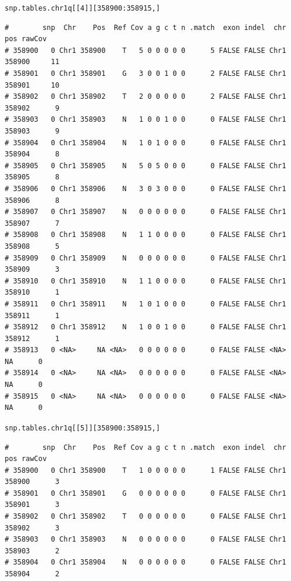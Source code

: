 \documentclass{article}\usepackage[]{graphicx}\usepackage[]{color}
\makeatletter
\newcommand{\hlnum}[1]{\textcolor[rgb]{0.686,0.059,0.569}{#1}}%
\newcommand{\hlopt}[1]{\textcolor[rgb]{0,0,0}{#1}}%
\newcommand{\hlstd}[1]{\textcolor[rgb]{0.345,0.345,0.345}{#1}}%
\newenvironment{kframe}{%
 \def\at@end@of@kframe{}%
 \ifinner\ifhmode%
  \def\at@end@of@kframe{\end{minipage}}%
  \begin{minipage}{\columnwidth}%
 \fi\fi%
 \def\FrameCommand##1{\hskip\@totalleftmargin \hskip-\fboxsep
 \colorbox{shadecolor}{##1}\hskip-\fboxsep
     \hskip-\linewidth \hskip-\@totalleftmargin \hskip\columnwidth}%
 \MakeFramed {\advance\hsize-\width
   \@totalleftmargin\z@ \linewidth\hsize
   \@setminipage}}%
 {\par\unskip\endMakeFramed%
 \at@end@of@kframe}
\newenvironment{knitrout}{}{} %
\makeatother
\begin{document}
\begin{knitrout}\footnotesize
{}\color{fgcolor}\begin{kframe}
\begin{alltt}
\hlstd{snp.tables.chr1q[[}\hlnum{4}\hlstd{]][}\hlnum{358900}\hlopt{:}\hlnum{358915}\hlstd{,]}
\end{alltt}
\begin{verbatim}
#        snp  Chr    Pos  Ref Cov a g c t n .match  exon indel  chr    pos rawCov
# 358900   0 Chr1 358900    T   5 0 0 0 0 0      5 FALSE FALSE Chr1 358900     11
# 358901   0 Chr1 358901    G   3 0 0 1 0 0      2 FALSE FALSE Chr1 358901     10
# 358902   0 Chr1 358902    T   2 0 0 0 0 0      2 FALSE FALSE Chr1 358902      9
# 358903   0 Chr1 358903    N   1 0 0 1 0 0      0 FALSE FALSE Chr1 358903      9
# 358904   0 Chr1 358904    N   1 0 1 0 0 0      0 FALSE FALSE Chr1 358904      8
# 358905   0 Chr1 358905    N   5 0 5 0 0 0      0 FALSE FALSE Chr1 358905      8
# 358906   0 Chr1 358906    N   3 0 3 0 0 0      0 FALSE FALSE Chr1 358906      8
# 358907   0 Chr1 358907    N   0 0 0 0 0 0      0 FALSE FALSE Chr1 358907      7
# 358908   0 Chr1 358908    N   1 1 0 0 0 0      0 FALSE FALSE Chr1 358908      5
# 358909   0 Chr1 358909    N   0 0 0 0 0 0      0 FALSE FALSE Chr1 358909      3
# 358910   0 Chr1 358910    N   1 1 0 0 0 0      0 FALSE FALSE Chr1 358910      1
# 358911   0 Chr1 358911    N   1 0 1 0 0 0      0 FALSE FALSE Chr1 358911      1
# 358912   0 Chr1 358912    N   1 0 0 1 0 0      0 FALSE FALSE Chr1 358912      1
# 358913   0 <NA>     NA <NA>   0 0 0 0 0 0      0 FALSE FALSE <NA>     NA      0
# 358914   0 <NA>     NA <NA>   0 0 0 0 0 0      0 FALSE FALSE <NA>     NA      0
# 358915   0 <NA>     NA <NA>   0 0 0 0 0 0      0 FALSE FALSE <NA>     NA      0
\end{verbatim}
\begin{alltt}
\hlstd{snp.tables.chr1q[[}\hlnum{5}\hlstd{]][}\hlnum{358900}\hlopt{:}\hlnum{358915}\hlstd{,]}
\end{alltt}
\begin{verbatim}
#        snp  Chr    Pos  Ref Cov a g c t n .match  exon indel  chr    pos rawCov
# 358900   0 Chr1 358900    T   1 0 0 0 0 0      1 FALSE FALSE Chr1 358900      3
# 358901   0 Chr1 358901    G   0 0 0 0 0 0      0 FALSE FALSE Chr1 358901      3
# 358902   0 Chr1 358902    T   0 0 0 0 0 0      0 FALSE FALSE Chr1 358902      3
# 358903   0 Chr1 358903    N   0 0 0 0 0 0      0 FALSE FALSE Chr1 358903      2
# 358904   0 Chr1 358904    N   0 0 0 0 0 0      0 FALSE FALSE Chr1 358904      2

\end{verbatim}
\end{kframe}
\end{knitrout}
\end{document}
